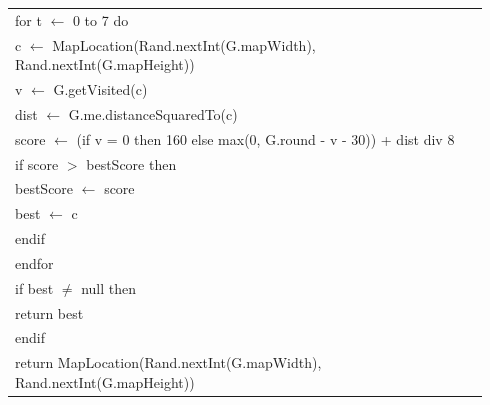 \documentclass{article}
\newenvironment{pseudobox}
{
\centering
\begin{longtable}{|p{0.94\linewidth}|}
\hline
}
{
\\ \hline
\end{longtable}
\vspace{0.05cm}
}
\begin{document}
\begin{pseudobox}
\hspace*{1em} for t $\leftarrow$ 0 to 7 do \\
\hspace*{2em} c $\leftarrow$ MapLocation(Rand.nextInt(G.mapWidth), Rand.nextInt(G.mapHeight)) \\
\hspace*{2em} v $\leftarrow$ G.getVisited(c) \\
\hspace*{2em} dist $\leftarrow$ G.me.distanceSquaredTo(c) \\
\hspace*{2em} score $\leftarrow$ (if v = 0 then 160 else max(0, G.round - v - 30)) + dist div 8 \\

\hspace*{2em} if score $>$ bestScore then \\
\hspace*{3em} bestScore $\leftarrow$ score \\
\hspace*{3em} best $\leftarrow$ c \\
\hspace*{2em} endif \\
\hspace*{1em} endfor \\

\hspace*{1em} if best $\neq$ null then \\
\hspace*{2em} return best \\
\hspace*{1em} endif \\

\hspace*{1em} return MapLocation(Rand.nextInt(G.mapWidth), Rand.nextInt(G.mapHeight))
\end{pseudobox}
\end{document}
